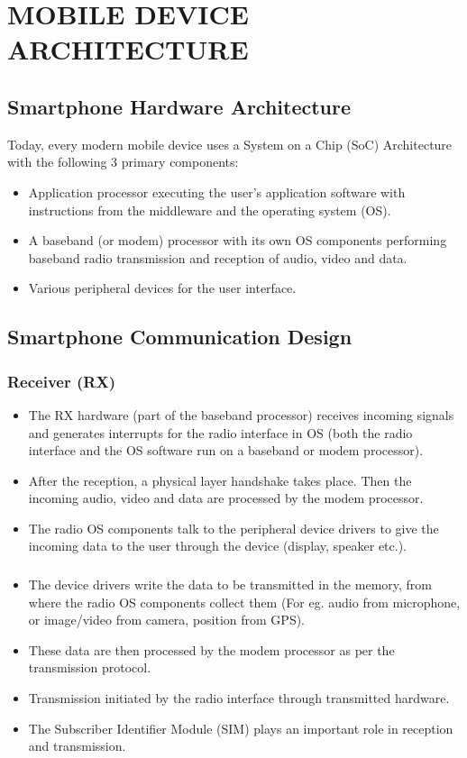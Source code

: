 \documentclass[conference]{IEEEtran}
\begin{document}
\section{MOBILE DEVICE ARCHITECTURE}

\subsection{Smartphone Hardware Architecture}
Today, every modern mobile device uses a System on a Chip (SoC) Architecture with the following 3 primary components:
\begin{itemize}
    \item Application processor executing the user's application software with instructions from the middleware and the operating system (OS).
    \item A baseband (or modem) processor with its own OS components performing baseband radio transmission and reception of audio, video and data.
    \item Various peripheral devices for the user interface.
\end{itemize}

\subsection{Smartphone Communication Design}

\subsubsection{Receiver (RX)}
\begin{itemize}
    \item The RX hardware (part of the baseband processor) receives incoming signals and generates interrupts for the radio interface in OS (both the radio interface and the OS software run on a baseband or modem processor).
    \item After the reception, a physical layer handshake takes place. Then the incoming audio, video and data are processed by the modem processor.
    \item The radio OS components talk to the peripheral device drivers to give the incoming data to the user through the device (display, speaker etc.).
\end{itemize}

\subsubsection{}
\begin{itemize}
    \item The device drivers write the data to be transmitted in the memory, from where the radio OS components collect them (For eg. audio from microphone, or image/video from camera, position from GPS).
    \item These data are then processed by the modem processor as per the transmission protocol.
    \item Transmission initiated by the radio interface through transmitted hardware.
    \item The Subscriber Identifier Module (SIM) plays an important role in reception and transmission.
\end{itemize}
\end{document}
